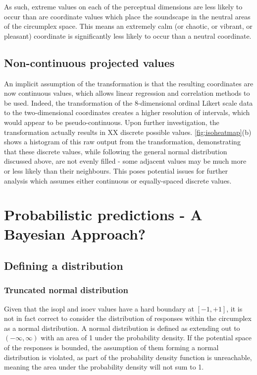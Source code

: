 As such, extreme values on each of the perceptual dimensions are less likely to occur than are coordinate values which place the soundscape in the neutral areas of the circumplex space. This means an extremely calm (or chaotic, or vibrant, or pleasant) coordinate is significantly less likely to occur than a neutral coordinate.


\subsection{Non-continuous projected values}
An implicit assumption of the transformation is that the resulting coordinates are now continuous values, which allows linear regression and correlation methods to be used. Indeed, the transformation of the 8-dimensional ordinal Likert scale data to the two-dimensional coordinates creates a higher resolution of intervals, which would appear to be pseudo-continuous. Upon further investigation, the transformation actually results in XX discrete possible values. \cref{fig:isoheatmap}(b) shows a histogram of this raw output from the transformation, demonstrating that these discrete values, while following the general normal distribution discussed above, are not evenly filled - some adjacent values may be much more or less likely than their neighbours. This poses potential issues for further analysis which assumes either continuous or equally-spaced discrete values.


\section{Probabilistic predictions - A Bayesian Approach?}

\subsection{Defining a distribution}

\subsubsection{Truncated normal distribution}

Given that the \gls{isopl} and \gls{isoev} values have a hard boundary at $[-1, +1]$, it is not in fact correct to consider the distribution of responses within the circumplex as a normal distribution. A normal distribution is defined as extending out to $(-\infty, \infty)$ with an area of 1 under the probability density. If the potential space of the responses is bounded, the assumption of them forming a normal distribution is violated, as part of the probability density function is unreachable, meaning the area under the probability density will not sum to 1.

